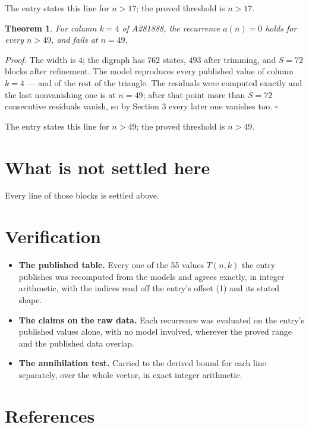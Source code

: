 \documentclass[11pt]{article}
\newtheorem{theorem}{Theorem}
\theoremstyle{definition}
\begin{document}
The entry states this line for $n > 17$; the proved threshold is $n > 17$.

\begin{theorem} For column $k = 4$ of A281888, the recurrence $a(n) = 0$ holds for every $n > 49$, and fails at $n = 49$.\end{theorem}

{\itshape Proof.} The width is $4$; the digraph has $762$ states, $493$ after trimming, and $S = 72$ blocks after refinement. The model reproduces every published value of column $k = 4$ --- and of the rest of the triangle. The residuals were computed exactly and the last nonvanishing one is at $n = 49$; after that point more than $S = 72$ consecutive residuals vanish, so by Section 3 every later one vanishes too. $\square$

The entry states this line for $n > 49$; the proved threshold is $n > 49$.

\section{What is not settled here}

Every line of those blocks is settled above.

\section{Verification}

\begin{itemize}

\item {\bfseries The published table.} Every one of the 55 values $T(n,k)$ the entry publishes was recomputed from the models and agrees exactly, in integer arithmetic, with the indices read off the entry's offset (1) and its stated shape.

\item {\bfseries The claims on the raw data.} Each recurrence was evaluated on the entry's published values alone, with no model involved, wherever the proved range and the published data overlap.

\item {\bfseries The annihilation test.} Carried to the derived bound for each line separately, over the whole vector, in exact integer arithmetic.

\end{itemize}

\section{References}
\end{document}
